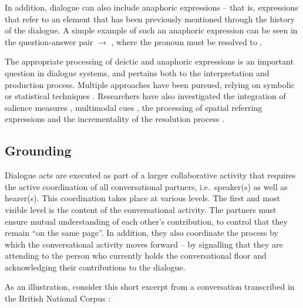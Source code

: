 In addition, dialogue can also include anaphoric expressions -- that is, expressions that refer to an element that has been previously mentioned through the history of the dialogue. A simple example of such an anaphoric expression can be seen in the question-answer pair  $\rightarrow$ , where the pronoun  must be resolved to . 

The appropriate processing of deictic and anaphoric expressions is an important question in dialogue systems, and pertains both to the interpretation and production process. Multiple approaches have been pursued, relying on symbolic \citep{Eckert2000} or statistical techniques \citep{StrubeM03,Stent2010}.  Researchers have also investigated the integration of salience measures \citep{Kelleher:2004}, multimodal cues \citep{Frampton:2009,Chen:2011}, the processing of spatial referring expressions \citep{zender/etal:2009-ijcai} and the incrementality of the resolution process \citep{schlangen2009incremental,poesio2011incremental}. 

\subsection{Grounding}

Dialogue acts are executed as part of a larger collaborative activity that requires the active coordination of all conversational partners, i.e.\ speaker(s) as well as hearer(s).  This coordination takes place at various levels.  The first and most visible level is the content of the conversational activity.   The partners must ensure mutual understanding of each other's contribution, to control that they remain ``on the same page''.  In addition, they  also coordinate the process by which the conversational activity moves forward -- by signalling that they are attending to the person who currently holds the conversational floor and acknowledging their contributions to the dialogue.

As an illustration, consider this short excerpt from a conversation transcribed in the British National Corpus \citep{bnc} :

